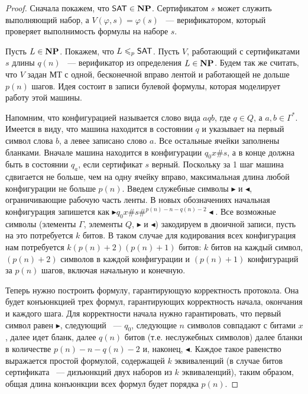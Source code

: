 \begin{proof}
Сначала покажем, что $\mathsf{SAT} \in \textbf{NP}$. Сертификатом $s$ может служить выполняющий набор, а $V(\varphi,s) = \varphi(s)$ ~--- верификатором, который проверяет выполнимость формулы на наборе $s$.

Пусть $L \in \textbf{NP}$. Покажем, что $L \leqslant_p \mathsf{SAT}$. Пусть $V$, работающий с сертификатами $s$ длины $q(n)$ ~--- верификатор из определения $L \in \textbf{NP}$. Будем так же считать, что $V$ задан МТ с одной, бесконечной вправо лентой и работающей не дольше $p(n)$ шагов. Идея состоит в записи булевой формулы, которая моделирует работу этой машины.

Напомним, что конфигурацией называется слово вида $aqb$, где $q \in Q$, а $a,b \in \Gamma^*$. Имеется в виду, что машина находится в состоянии $q$ и указывает на первый символ слова $b$, а левее записано слово $a$. Все остальные ячейки заполнены бланками. Вначале машина находится в конфигурации $q_0x\#s$, а в конце должна быть в состоянии $q_a$, если сертификат $s$ верный. Поскольку за 1 шаг машина сдвигается не больше, чем на одну ячейку вправо, максимальная длина любой конфигурации не больше $p(n)$. Введем служебные символы $\blacktriangleright$ и $\blacktriangleleft$, ограничивающие рабочую часть ленты. В новых обозначениях начальная конфигурация запишется как $\blacktriangleright q_0x\#s\#^{p(n)-n-q(n)-2}\blacktriangleleft$. 
Все возможные символы (элементы $\Gamma$, элементы $Q$, $\blacktriangleright$ и $\blacktriangleleft$) закодируем в двоичной записи, пусть на это потребуется $k$ битов. В таком случае для кодирования всех конфигурация нам потребуется $k(p(n)+2)(p(n) + 1)$ битов: $k$ битов на каждый символ, $(p(n)+2)$ символов в каждой конфигурации и $(p(n)+1)$ конфигураций за $p(n)$ шагов, включая начальную и конечную.

Теперь нужно построить формулу, гарантирующую корректность протокола. Она будет конъюнкцией трех формул, гарантирующих корректность начала, окончания и каждого шага. Для корректности начала нужно гарантировать, что первый символ равен $\blacktriangleright$, следующий ~--- $q_0$, следующие $n$ символов совпадают с битами $x$, далее идет бланк, далее $q(n)$ битов (т.е. неслужебных символов) далее бланки в количестве $p(n)-n-q(n)-2$ и, наконец, $\blacktriangleleft$. Каждое такое равенство выражается простой формулой, содержащей $k$ эквиваленций (в случае битов сертификата ~--- дизъюнкций двух наборов из $k$ эквиваленций), таким образом, общая длина конъюнкции всех формул будет порядка $p(n)$.


\end{proof}

